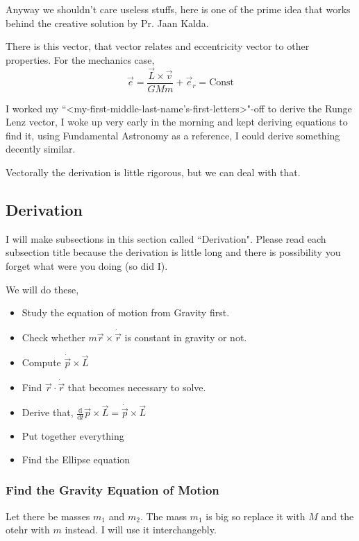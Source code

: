 \documentclass[11pt,a4paper]{article}
\begin{document}
Anyway we shouldn't care useless stuffs, here is one of the prime idea that works behind the creative solution by Pr. Jaan Kalda.

There is this vector, that vector relates and eccentricity vector to other properties. For the mechanics case,
\[ 
\vec{e}  = \frac{\vec{L} \times  \vec{v}}{GM m } + \vec{e}_r = \text{Const}
\]


I worked my ``<my-first-middle-last-name's-first-letters>"-off to derive the Runge Lenz vector, I woke up very early in the morning and kept deriving equations to find it, using Fundamental Astronomy as a reference, I could derive something decently similar. 

Vectorally the derivation is little rigorous, but we can deal with that. 

\subsection{ Derivation }
I will make subsections in this section called ``Derivation". Please read each subsection title because the derivation is little long and there is possibility you forget what were you doing (so did I). 

We will do these, 
\begin{itemize}
    \item Study the equation of motion from Gravity first.
    \item Check whether $m \vec{r} \times  \dot{\vec{r}}$ is constant in gravity or not.
    \item Compute $ \dot{\vec{p}} \times  \vec{L} $ 
    \item Find $\vec{r}\cdot \dot{\vec{r}}$ that becomes necessary to solve.
    \item Derive that, $ \frac{\mathrm{d} }{\mathrm{d} t} \vec{p} \times  \vec{L} = \dot{\vec{p}}\times  \vec{L}$
    \item Put together everything 
    \item Find the Ellipse equation
\end{itemize}

\subsubsection{ Find the Gravity Equation of Motion }
Let there be masses $m_1$ and $m_2$. The mass $m_1$ is big so replace it with $M$ and the otehr with $m$ instead. I will use it interchangebly. 
\end{document}
